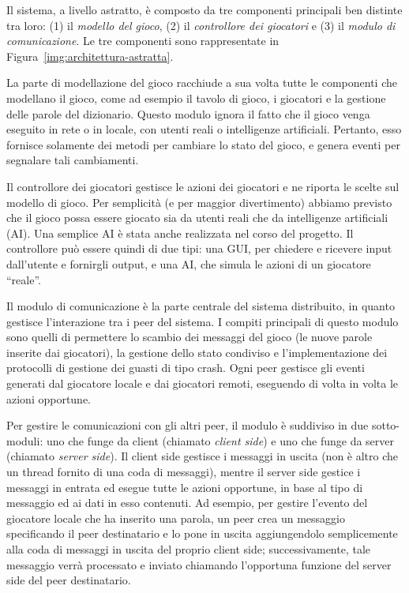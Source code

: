 \documentclass[10.5pt]{article}
\begin{document}
Il sistema, a livello astratto, è composto da tre componenti principali ben distinte tra loro: (1) il \emph{modello del gioco}, (2) il \emph{controllore dei giocatori} e (3) il \emph{modulo di comunicazione}. Le tre componenti sono rappresentate in Figura~\ref{img:architettura-astratta}.

La parte di modellazione del gioco racchiude a sua volta tutte le componenti che modellano il gioco, come ad esempio il tavolo di gioco, i giocatori e la gestione delle parole del dizionario.
Questo modulo ignora il fatto che il gioco venga eseguito in rete o in locale, con utenti reali o intelligenze artificiali.
Pertanto, esso fornisce solamente dei metodi per cambiare lo stato del gioco, e genera eventi per segnalare tali cambiamenti.

Il controllore dei giocatori gestisce le azioni dei giocatori e ne riporta le scelte sul modello di gioco. Per semplicità (e per maggior divertimento) abbiamo previsto che il gioco possa essere giocato sia da utenti reali che da intelligenze artificiali (AI). Una semplice AI è stata anche realizzata nel corso del progetto. Il controllore può essere quindi di due tipi: una GUI, per chiedere e ricevere input dall'utente e fornirgli output, e una AI, che simula le azioni di un giocatore ``reale''.

Il modulo di comunicazione è la parte centrale del sistema distribuito, in quanto gestisce l'interazione tra i peer del sistema. I compiti principali di questo modulo sono quelli di permettere lo scambio dei messaggi del gioco (le nuove parole inserite dai giocatori), la gestione dello stato condiviso e l'implementazione dei protocolli di gestione dei guasti di tipo crash.
Ogni peer gestisce gli eventi generati dal giocatore locale e dai giocatori remoti, eseguendo di volta in volta le azioni opportune.

Per gestire le comunicazioni con gli altri peer, il modulo è suddiviso in due sotto-moduli: uno che funge da client (chiamato \emph{client side}) e uno che funge da server (chiamato \emph{server side}). Il client side gestisce i messaggi in uscita (non è altro che un thread fornito di una coda di messaggi), mentre il server side gestice i messaggi in entrata ed esegue tutte le azioni opportune, in base al tipo di messaggio ed ai dati in esso contenuti. 
Ad esempio, per gestire l'evento del giocatore locale che ha inserito una parola, un peer crea un messaggio specificando il peer destinatario e lo pone in uscita aggiungendolo semplicemente alla coda di messaggi in uscita del proprio client side; successivamente, tale messaggio verrà processato e inviato chiamando l'opportuna funzione del server side del peer destinatario.
\end{document}
